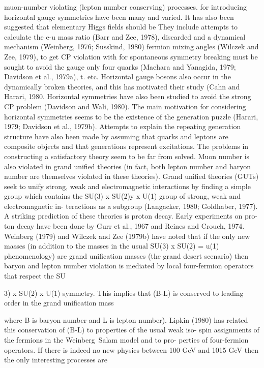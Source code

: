 \documentclass[twoside]{article}
\begin{document}
{{muon-number violating (lepton number conserving) processes. for introducing horizontal gauge symmetries have been many and varied.
It has also been suggested that elementary Higgs fields should be They include attempts to calculate the e-u mass ratio (Barr and Zee, 1978),
discarded and a dynamical mechanism (Weinberg, 1976; Susskind, 1980) fermion mixing angles (Wilczek and Zee, 1979), to get CP violation with
for spontaneous symmetry breaking must be sought to avoid the gauge only four quarks (Maehara and Yanagida, 1979; Davidson et al., 1979a),
t. 
etc. Horizontal gauge bosons also occur in the dynamically broken
theories, and this has motivated their study (Cahn and Harari, 1980}.
Horizontal symmetries have also been studied to avoid the strong CP
problem (Davidson and Wali, 1980). The main motivation for considering
horizontal symmetries seems to be the existence of the generation puzzle
(Harari, 1979; Davidson et al., 1979b). Attempts to explain the repeating
generation structure have also been made by assuming that quarks and
leptons are composite objects and that generations represent excitations.
The problems in constructing a satisfactory theory seem to be far from solved.
Muon number is also violated in grand unified theories (in fact,
both lepton number and baryon number are themselves violated in these
theories). Grand unified theories (GUTs) seek to unify strong, weak
and electromagnetic interactions by finding a simple group which contains
the SU(3) x SU(2)y x U(1) group of strong, weak and electromagnetic in-
teractions as a subgroup (Langacker, 1980; Goldhaber, 1977). A striking
prediction of these theories is proton decay. Early experiments on pro-
ton decay have been done by Gurr et al., 1967 and Reines and Crouch, 1974.
Weinberg (1979) and Wilczek and Zee (1979b) have noted that if the only
new masses (in addition to the masses in the usual SU(3) x SU(2) = u(1)
phenomenology) are grand unification masses (the grand desert scenario)
then baryon and lepton number violation is mediated by local four-fermion
operators that respect the SU{3) x SU(2) x U(1) symmetry. This implies
that (B-L) is conserved to leading order in the grand unification mass
{where B is baryon number and L is lepton number). Lipkin (1980) has
related this conservation of (B-L) to properties of the usual weak iso-
spin assignments of the fermions in the Weinberg~Salam model and to pro-
perties of four-fermion operators. If there is indeed no new physics
between 100 GeV and 1015 GeV then the only interesting processes are

}}}
\end{document}
